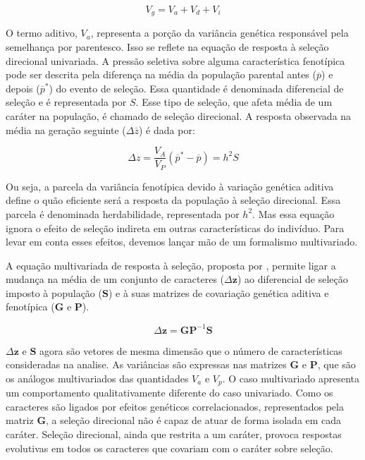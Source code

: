 \begin{equation}
    V_g = V_a + V_d + V_{i}
    \label{compgen}
\end{equation}

O termo aditivo, $V_a$, representa a porção da variância genética
responsável pela semelhança por parentesco.
Isso se reflete na equação de resposta à seleção direcional univariada.
A pressão seletiva sobre alguma característica fenotípica pode ser descrita
pela diferença na média da população parental antes ($\overline p$) e depois
($\overline p^*$) do evento de seleção.
Essa quantidade é denominada diferencial de seleção e é representada por
$S$.
Esse tipo de seleção, que afeta média de um caráter na população, é
chamado de seleção direcional.
A resposta observada na média na geração seguinte ($\Delta \overline z$) é dada
por:

\begin{equation}
    \Delta z = \frac{V_A}{V_P} (\overline p^* - \overline p) = h^2S
\end{equation}

Ou seja, a parcela da variância fenotípica devido à variação genética
aditiva define o quão eficiente será a resposta da população à seleção
direcional.
Essa parcela é denominada herdabilidade, representada por $h^2$.
Mas essa equação ignora o efeito de seleção indireta em outras
características do indivíduo.
Para levar em conta esses efeitos, devemos
lançar mão de um formalismo multivariado.

A equação multivariada de resposta à seleção,
proposta por \cite{Lande1979}, permite ligar a mudança na média de um
conjunto de caracteres ($\Delta \mathbf{z}$) ao diferencial de seleção imposto à população
($\mathbf{S}$) e à suas matrizes de covariação genética aditiva e fenotípica
($\mathbf{G}$ e $\mathbf{P}$).

\begin{equation}
    \Delta \mathbf{z} = \mathbf{GP}^{-1}\mathbf{S}
    \label{landeZGS}
\end{equation}
 
$\Delta \mathbf{z}$ e $\mathbf{S}$ agora são vetores de mesma dimensão que o número
de características consideradas na analise.
As variâncias são expressas nas matrizes $\mathbf{G}$ e $\mathbf{P}$, que são os análogos
multivariados das quantidades $V_a$ e $V_p$.
O caso multivariado apresenta um comportamento qualitativamente
diferente do caso univariado.
Como os caracteres são ligados por efeitos genéticos correlacionados,
representados pela matriz $\mathbf{G}$, a seleção direcional não é capaz de atuar de
forma isolada em cada caráter.
Seleção direcional, ainda que restrita a um caráter, provoca respostas
evolutivas em todos os caracteres que covariam com o caráter sobre
seleção.

